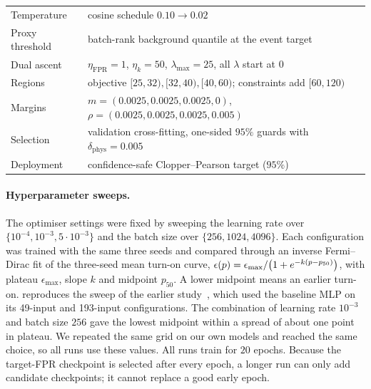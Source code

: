 \begin{table}[ht]
\begin{tabularx}{\linewidth}{@{}lX@{}}
    Temperature & cosine schedule $0.10\to0.02$ \\
    Proxy threshold & batch-rank background quantile at the event target \\
    Dual ascent & $\eta_{\mathrm{FPR}}=1$, $\eta_k=50$, $\lambda_{\max}=25$, all $\lambda$ start at $0$ \\
    Regions & objective $[25,32),[32,40),[40,60)$; constraints add $[60,120)$ \\
    Margins & $m=(0.0025,0.0025,0.0025,0)$, $\rho=(0.0025,0.0025,0.0025,0.005)$ \\
    Selection & validation cross-fitting, one-sided $95\%$ guards with $\delta_{\mathrm{phys}}=0.005$ \\
    Deployment & confidence-safe Clopper--Pearson target ($95\%$) \\
    \bottomrule
  \end{tabularx}
\end{table}

\paragraph{Hyperparameter sweeps.}
The optimiser settings were fixed by sweeping the learning rate over $\{10^{-4},10^{-3},5\cdot10^{-3}\}$ and the batch size over $\{256,1024,4096\}$. Each configuration was trained with the same three seeds and compared through an inverse Fermi--Dirac fit of the three-seed mean turn-on curve, $\epsilon(p)=\epsilon_{\max}/\big(1+e^{-k(p-p_{50})}\big)$, with plateau $\epsilon_{\max}$, slope $k$ and midpoint $p_{50}$. A lower midpoint means an earlier turn-on.  reproduces the sweep of the earlier study~\cite{kernan2026}, which used the baseline MLP on its 49-input and 193-input configurations. The combination of learning rate $10^{-3}$ and batch size $256$ gave the lowest midpoint within a spread of about one point in plateau. We repeated the same grid on our own models and reached the same choice, so all runs use these values. All runs train for $20$ epochs. Because the target-FPR checkpoint is selected after every epoch, a longer run can only add candidate checkpoints; it cannot replace a good early epoch.

